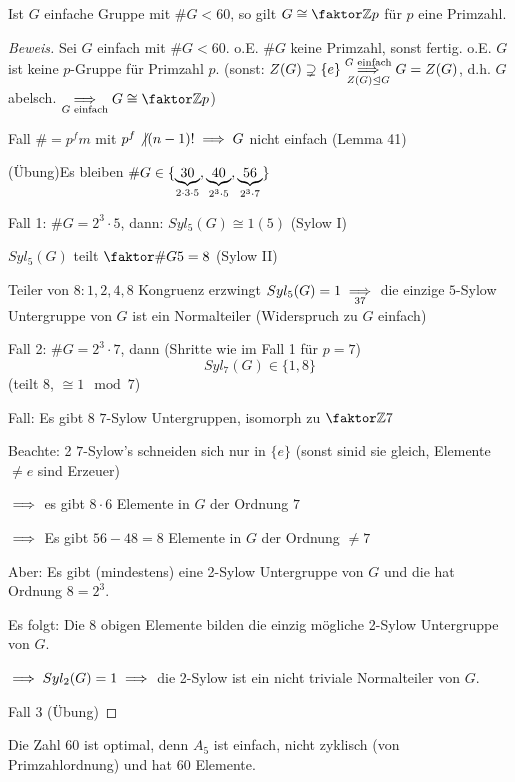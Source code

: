 \documentclass[a4paper]{report}
\begin{document}
\begin{satz}
Ist $G$ einfache Gruppe mit $\#G < 60$, so gilt $G \cong \fak \Z p$ für $p$ eine Primzahl.
\end{satz}
\begin{proof}[Beweis]
  Sei $G$ einfach mit $\#G < 60$. o.E. $\#G$ keine Primzahl, sonst fertig.
  o.E. $G$ ist keine $p$-Gruppe für Primzahl $p$. (sonst: $Z(G) \supsetneq \{e\} \overunderset{G \text{ einfach}}{Z(G) \nt G} \imp G = Z(G)$, d.h. $G$ abelsch. $\underset{G \text{ einfach}} \imp G \cong \fak \Z p$)

  Fall $\# = p^{f}m$ mit $p^{f} \not | (n-1)! \implies G$ nicht einfach (Lemma 41)

  (Übung)Es bleiben $\#G \in \{\underbrace{30}_{2 \cdot 3 \cdot 5}, \underbrace{40}_{2^{3} \cdot 5}, \underbrace{56}_{2^{3}\cdot 7}\}$

  Fall 1: $\#G = 2^{3} \cdot 5$, dann:
  $Syl_{5}(G) \cong 1(5)$ (Sylow I)

  $Syl_{5}(G)$ teilt $\fak {\#G}5 = 8$ (Sylow II)

  Teiler von $8: 1, 2, 4, 8$
  Kongruenz erzwingt $Syl_{5}(G) = 1 \underset{37} {\implies}$ die einzige $5$-Sylow Untergruppe von $G$ ist ein Normalteiler (Widerspruch zu $G$ einfach)

  Fall 2: $\# G = 2^{3} \cdot 7$, dann (Shritte wie im Fall 1 für $p=7$)
  \[Syl_{7}(G) \in \{1, 8\}\]
  (teilt $8$, $\cong 1 \mod 7$)

  Fall: Es gibt $8$ $7$-Sylow Untergruppen, isomorph zu $\fak \Z 7$

  Beachte: 2 $7$-Sylow's schneiden sich nur in $\{e\}$ (sonst sinid sie gleich, Elemente $\ne e$ sind Erzeuer)

  $\implies$ es gibt $8\cdot 6$ Elemente in $G$ der Ordnung $7$

  $\implies$ Es gibt $56-48 = 8$ Elemente in $G$ der Ordnung $\ne 7$

  Aber: Es gibt (mindestens) eine 2-Sylow Untergruppe von $G$ und die hat Ordnung $8 = 2^{3}$.

  Es folgt: Die 8 obigen Elemente bilden die einzig mögliche 2-Sylow Untergruppe von $G$.

  $\implies Syl_{2}(G) = 1 \implies$ die 2-Sylow ist ein nicht triviale Normalteiler von $G$.


  Fall 3 (Übung)
\end{proof}
\begin{bem*} Die Zahl 60 ist optimal, denn $A_{5}$ ist einfach, nicht zyklisch (von Primzahlordnung) und hat 60 Elemente.
\end{bem*}
\end{document}
